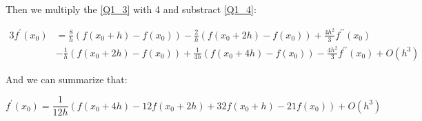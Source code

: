 \begin{solution}
Then we multiply the \ref{Q1_3} with 4 and substract \ref{Q1_4}:


\begin{equation}
\begin{aligned}
3 f^{\prime}\left(x_{0}\right) &=\frac{8}{h}\left(f\left(x_{0}+h\right)-f\left(x_{0}\right)\right)-\frac{2}{h}\left(f\left(x_{0}+2 h\right)-f\left(x_{0}\right)\right)+\frac{4 h^{2}}{3} f^{\prime \prime}\left(x_{0}\right) \\
&-\frac{1}{h}\left(f\left(x_{0}+2 h\right)-f\left(x_{0}\right)\right)+\frac{1}{4 h}\left(f\left(x_{0}+4 h\right)-f\left(x_{0}\right)\right)-\frac{4 h^{2}}{3} f^{\prime \prime}\left(x_{0}\right)+O\left(h^{3}\right)
\end{aligned}
\end{equation}

And we can summarize that:


\begin{equation}
f^{\prime}\left(x_{0}\right)=\frac{1}{12 h}\left(f\left(x_{0}+4 h\right)-12 f(x_0+2 h)+32 f\left(x_{0}+h\right)-21 f\left(x_{0}\right)\right)+O\left(h^{3}\right)
\end{equation}






\end{solution}


